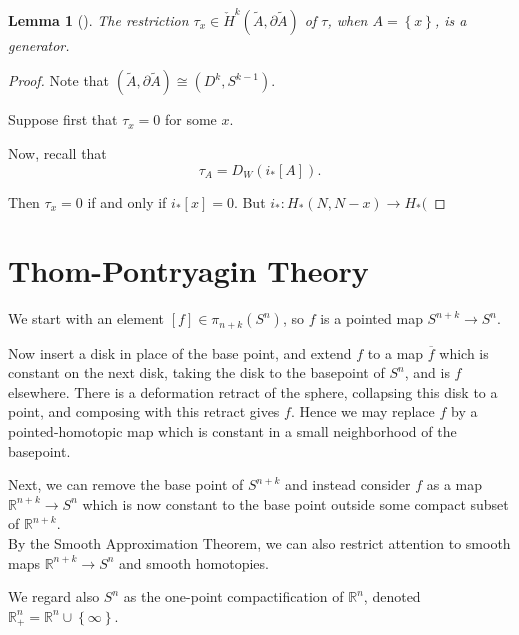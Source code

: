 \documentclass[reqno]{amsart}
\newtheorem{lemma}[theorem]{Lemma}
\theoremstyle{definition}
\theoremstyle{remark}
\begin{document}
\begin{lemma}[]
    The restriction $\tau_x \in 
    \check{H}^{k}( \tilde{A}, \partial \tilde{A})$ of
    $\tau$, when $A = \left\{ x \right\} $, is a 
    generator.
\end{lemma}

\begin{proof}
    Note that 
    $\left( \tilde{A}, \partial \tilde{A} \right) 
    \cong \left( D^{k}, S^{k-1} \right) $.

    Suppose first that $\tau_x = 0$ for some $x$.

    Now, recall that
    \[
    \tau_{A} = 
    D_W \left( i_* \left[ A \right]  \right) .
    \] 

    Then
    $\tau_x = 0$ if and only if
    $i_* \left[ x \right] = 0$.
    But $i_* \colon 
    H_* \left( N, N - x \right) 
    \to H_* ($



\end{proof}


\section{Thom-Pontryagin Theory}

We start with an element
$\left[ f \right]  \in \pi_{n+k}\left( S^{n} \right) $, so
$f$ is a pointed map
$S^{n+k} \to S^{n}$.

Now insert a disk in place of the
base point, and extend $f$ to a map
$\overline{f}$ which is constant on the
next disk, taking the disk to the basepoint of
$S^{n}$, and is $f$ elsewhere.
There is a deformation retract of the sphere, collapsing
this disk to a point, and composing with this retract
gives $f$. Hence we may replace $f$ by a pointed-homotopic map
which is constant in a small neighborhood of
the basepoint.

Next, we can remove the base point of
$S^{n+k}$ and instead consider $f$ as a map
$\mathbb{R}^{n+k} \to S^{n}$ which is now constant
to the base point outside some compact
subset of $\mathbb{R}^{n+k}$.\\
\linebreak
By the Smooth Approximation Theorem, we can
also restrict attention to smooth maps
$\mathbb{R}^{n+k} \to S^{n}$ and smooth
homotopies. 

We regard also $S^{n}$ as the one-point compactification
of $\mathbb{R}^{n}$, denoted
$\mathbb{R}_+^{n} = \mathbb{R}^{n} \cup  \left\{ \infty \right\} $.
\end{document}
